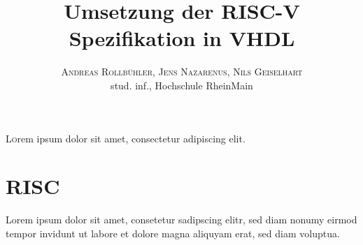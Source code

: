 \documentclass[twoside,twocolumn]{article}
\title{\vspace{-7mm}%
	\fontsize{24pt}{10pt}\selectfont
	\textbf{Umsetzung der RISC-V Spezifikation in VHDL}
	}
\author{%
	\large
	\textsc{Andreas Rollbühler, Jens Nazarenus, Nils Geiselhart} \\[2mm]
	\normalsize	stud. inf., Hochschule RheinMain \\
	\vspace{-5mm}
	}
\date{}
\begin{document}

\thispagestyle{fancy}


\lettrine[nindent=0em,lines=3]{L} orem ipsum dolor sit amet, consectetur adipiscing elit. \cite{Ashenden:609207}

\section{RISC} \label{mlsection}
Lorem ipsum dolor sit amet, consetetur sadipscing elitr, sed diam nonumy eirmod tempor invidunt ut labore et dolore magna aliquyam erat, sed diam voluptua.




\end{document}
